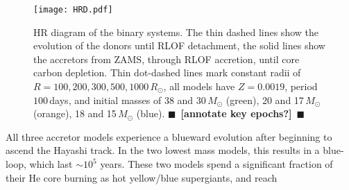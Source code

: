 \documentclass[twocolumn,twocolappendix,trackchanges]{aastex63}
\newcommand{\todo}[1]{{\large $\blacksquare$~\textbf{\color{red}[#1]}}~$\blacksquare$}
\begin{document}
\begin{figure}[htbp]
  \texttt{[image: HRD.pdf]}
  \caption{HR diagram of the binary systems. The thin dashed lines
    show the evolution of the donors until RLOF detachment, the solid
    lines show the accretors from ZAMS, through RLOF accretion, until
    core carbon depletion. Thin dot-dashed lines mark constant radii
    of $R=100, 200, 300, 500, 1000\,R_\odot$, all models have
    $Z=0.0019$, period $100$\,days, and initial masses of 38 and
    30\,$M_\odot$ (green), 20 and 17\,$M_\odot$ (orange), 18 and
    15\,$M_\odot$ (blue). \todo{annotate key epochs?}}
  \label{fig:HRD}
\end{figure}

All three accretor models experience a blueward evolution after
beginning to ascend the Hayashi track. In the two lowest mass models,
this results in a blue-loop, which last $\sim{}10^5$ years. These two
models spend a significant fraction of their He core burning as hot
yellow/blue supergiants, and reach
\end{document}
